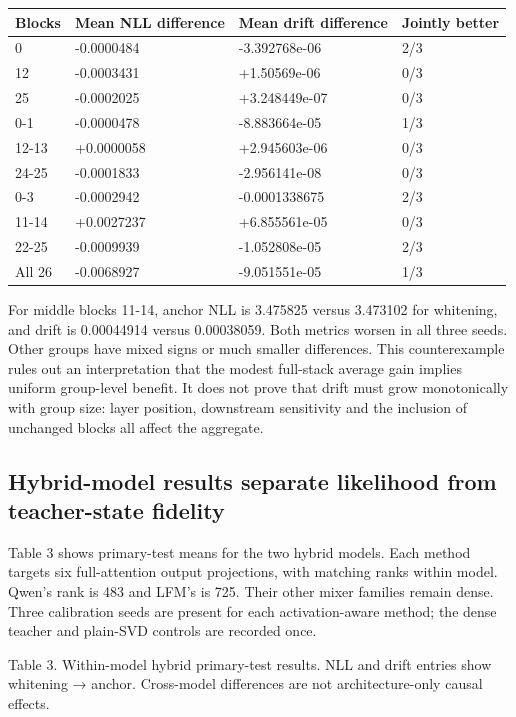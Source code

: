 \documentclass[10pt]{article}
\begin{document}
{\scriptsize\setlength{\tabcolsep}{2pt}
\begin{longtable}{p{}p{}p{}p{}}
Blocks & Mean NLL difference & Mean drift difference & Jointly better \\
\hline\endhead
0 & -0.0000484 & -3.392768e-06 & 2/3 \\
12 & -0.0003431 & +1.50569e-06 & 0/3 \\
25 & -0.0002025 & +3.248449e-07 & 0/3 \\
0-1 & -0.0000478 & -8.883664e-05 & 1/3 \\
12-13 & +0.0000058 & +2.945603e-06 & 0/3 \\
24-25 & -0.0001833 & -2.956141e-08 & 0/3 \\
0-3 & -0.0002942 & -0.0001338675 & 2/3 \\
11-14 & +0.0027237 & +6.855561e-05 & 0/3 \\
22-25 & -0.0009939 & -1.052808e-05 & 2/3 \\
All 26 & -0.0068927 & -9.051551e-05 & 1/3 \\
\end{longtable}}

For middle blocks 11-14, anchor NLL is 3.475825 versus 3.473102 for whitening, and drift is 0.00044914 versus 0.00038059. Both metrics worsen in all three seeds. Other groups have mixed signs or much smaller differences. This counterexample rules out an interpretation that the modest full-stack average gain implies uniform group-level benefit. It does not prove that drift must grow monotonically with group size: layer position, downstream sensitivity and the inclusion of unchanged blocks all affect the aggregate.

\subsection{Hybrid-model results separate likelihood from teacher-state fidelity}

Table 3 shows primary-test means for the two hybrid models. Each method targets six full-attention output projections, with matching ranks within model. Qwen's rank is 483 and LFM's is 725. Their other mixer families remain dense. Three calibration seeds are present for each activation-aware method; the dense teacher and plain-SVD controls are recorded once.

Table 3. Within-model hybrid primary-test results. NLL and drift entries show whitening → anchor. Cross-model differences are not architecture-only causal effects.
\end{document}
